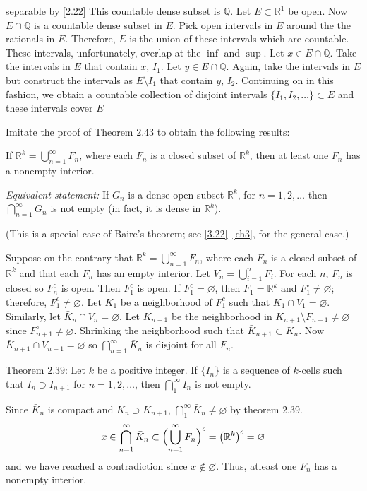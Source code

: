 \begin{exercise}
  separable by \cref{2.22}
  This countable dense subset is \(\mathbb{Q}\).
  Let \(E\subset\mathbb{R}^1\) be open.
  Now \(E\cap\mathbb{Q}\) is a countable dense subset in \(E\).
  Pick open intervals in \(E\) around the the rationals in \(E\).
  Therefore, \(E\) is the union of these intervals which are countable.
  These intervals, unfortunately, overlap at the \(\inf\) and \(\sup\).
  Let \(x\in E\cap\mathbb{Q}\).
  Take the intervals in \(E\) that contain \(x\), \(I_1\).
  Let \(y\in E\cap\mathbb{Q}\).
  Again, take the intervals in \(E\) but construct the intervals as
  \(E\setminus I_1\) that contain \(y\), \(I_2\).
  Continuing on in this fashion, we obtain a countable collection of disjoint
  intervals \(\{I_1,I_2,\ldots\}\subset E\) and these intervals cover \(E\)
\item
  Imitate the proof of Theorem \(2.43\) to obtain the following results:
  \par\smallskip
  If \(\mathbb{R}^k = \bigcup_{n = 1}^{\infty}F_n\), where each \(F_n\) is a
  closed subset of \(\mathbb{R}^k\), then at least one \(F_n\) has a nonempty
  interior.
  \par\smallskip
  \textit{Equivalent statement:} If \(G_n\) is a dense open subset
  \(\mathbb{R}^k\), for \(n = 1,2,\ldots\) then
  \(\bigcap_{n = 1}^{\infty}G_n\) is not empty (in fact, it is dense in
  \(\mathbb{R}^k\)).
  \par\smallskip
  (This is a special case of Baire's theorem; see \cref{3.22}~\cref{ch3}, for
  the general case.)
  \par\smallskip
  Suppose on the contrary that \(\mathbb{R}^k = \bigcup_{n = 1}^{\infty}F_n\),
  where each \(F_n\) is a closed subset of \(\mathbb{R}^k\) and that each
  \(F_n\) has an empty interior.
  Let \(V_n = \bigcup_{i = 1}^nF_i\).
  For each \(n\), \(F_n\)  is closed so \(F_n^c\) is open.
  Then \(F_1^c\) is open.
  If \(F_1^c = \varnothing\), then \(F_1 = \mathbb{R}^k\) and
  \(F_1^{\circ}\neq\varnothing\); therefore, \(F_1^c\neq\varnothing\).
  Let \(K_1\) be a neighborhood of \(F_1^c\) such that
  \(\bar{K}_1\cap V_1 = \varnothing\).
  Similarly, let \(\bar{K}_n\cap V_n = \varnothing\).
  Let \(K_{n + 1}\) be the neighborhood in
  \(K_{n + 1}\setminus F_{n + 1}\neq\varnothing\) since
  \(F_{n + 1}^{\circ}\neq\varnothing\).
  Shrinking the neighborhood such that \(\bar{K}_{n + 1}\subset K_n\).
  Now \(\bar{K}_{n + 1}\cap V_{n + 1} = \varnothing\) so
  \(\bigcap_{n = 1}^{\infty}\bar{K}_n\) is disjoint for all \(F_n\).
  \par\smallskip
  Theorem \(2.39\): Let \(k\) be a positive integer.
  If \(\{I_n\}\) is a sequence of \(k\)-cells such that
  \(I_n\supset I_{n + 1}\) for \(n = 1,2,\ldots\), then
  \(\bigcap_1^{\infty}I_n\) is not empty.
  \par\smallskip
  Since \(\bar{K}_n\) is compact and \(K_n\supset K_{n + 1}\),
  \(\bigcap_1^{\infty}\bar{K}_n\neq\varnothing\) by theorem \(2.39\).
  \[
  x\in\bigcap_{n = 1}^{\infty}\bar{K}_n\subset
  \Bigl(\bigcup_{n = 1}^{\infty}F_n\Bigr)^c = \bigl(\mathbb{R}^k\bigr)^c
  = \varnothing
  \]
  and we have reached a contradiction since \(x\not\in\varnothing\).
  Thus, atleast one \(F_n\) has a nonempty interior.
\end{exercise}


